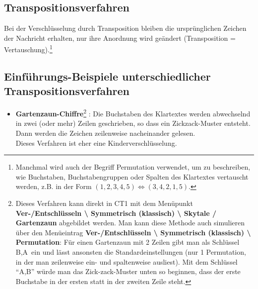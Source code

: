 \begin{refsegment}
\newpage
\section{Transpositionsverfahren}
\label{PaP_transposition_ciphers}

Bei der Verschlüsselung durch Transposition
bleiben die ursprünglichen Zeichen der Nachricht erhalten,
nur ihre Anordnung wird geändert (Transposition =
Vertauschung).\footnote{%
Manchmal wird auch der Begriff Permutation verwendet, um zu
beschreiben, wie Buchstaben, Buchstabengruppen oder Spalten des Klartextes
vertauscht werden, z.B. in der Form $(1, 2, 3, 4, 5)
\Leftrightarrow (3, 4, 2, 1, 5)$.
}

\subsection{Einführungs-Beispiele unterschiedlicher Transpositionsverfahren}
\label{introsamplesTranspositionCiphers}  %

\begin{itemize}

\item {\bf Gartenzaun-Chiffre}\footnote{%
   Dieses Verfahren kann direkt in CT1 mit dem Menüpunkt
   {\bf Ver-/Entschlüsseln \textbackslash{} Symmetrisch (klassisch)
   \textbackslash{} Skytale / Gartenzaun} abgebildet werden.
   Man kann diese Methode auch simulieren über den Menüeintrag
   {\bf Ver-/Entschlüsseln \textbackslash{} Symmetrisch (klassisch)
   \textbackslash{} Permutation}:
   Für einen Gartenzaun mit 2 Zeilen gibt man als Schlüssel
   \glqq B,A\grqq~ein und lässt ansonsten die Standardeinstellungen (nur 1
   Permutation, in der man zeilenweise ein- und spaltenweise ausliest).
   Mit dem Schlüssel "`A,B"' würde man das Zick-zack-Muster unten so
   beginnen, dass der erste Buchstabe in der ersten statt in der zweiten Zeile
   steht.}
   \cite{Singh2001}:
   Die Buchstaben des Klartextes werden abwechselnd in zwei (oder mehr)
   Zeilen geschrieben, so dass ein Zickzack-Muster entsteht.
   Dann werden die Zeichen zeilenweise nacheinander gelesen.\\
   Dieses Verfahren ist eher eine Kinderverschlüsselung.


\end{itemize}
\end{refsegment}
